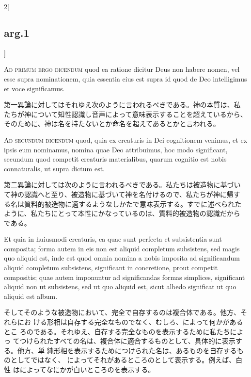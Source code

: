 \documentclass[paper=a4paper,fontsize=10pt,jafontsize=9pt,titlepage]{jlreq}
\begin{document}
\begin{paracol}{2}[\subsection{arg.1}]
\switchcolumn*[\subsection{ad.1}]

{\scshape Ad primum ergo dicendum} quod ea ratione dicitur Deus non habere
nomen, vel esse supra nominationem, quia essentia eius est supra id
quod de Deo intelligimus et voce significamus.

\switchcolumn

第一異論に対してはそれゆえ次のように言われるべきである。神の本質は、私
たちが神について知性認識し音声によって意味表示することを超えているから、
そのために、神は名を持たないとか命名を超えてあるとかと言われる。

\switchcolumn*[\subsection{ad.2}]

{\scshape Ad secundum dicendum} quod, quia ex creaturis in Dei cognitionem
venimus, et ex ipsis eum nominamus, nomina quae Deo attribuimus, hoc
modo significant, secundum quod competit creaturis materialibus, quarum
cognitio est nobis connaturalis, ut supra dictum est.

\switchcolumn

第二異論に対しては次のように言われるべきである。私たちは被造物に基づい
て神の認識へと至り、被造物に基づいて神を名付けるので、私たちが神に帰す
る名は質料的被造物に適するようなしかたで意味表示する。すでに述べられた
ように、私たちにとって本性にかなっているのは、質料的被造物の認識だから
である。

\switchcolumn*

Et quia in huiusmodi creaturis, ea quae sunt perfecta et subsistentia
sunt composita; forma autem in eis non est aliquid completum
subsistens, sed magis quo aliquid est, inde est quod omnia nomina a
nobis imposita ad significandum aliquid completum subsistens,
significant in concretione, prout competit compositis; quae autem
imponuntur ad significandas formas simplices, significant aliquid non
ut subsistens, sed ut quo aliquid est, sicut albedo significat ut quo
aliquid est album.

\switchcolumn

そしてそのような被造物において、完全で自存するのは複合体である。他方、それらにお
ける形相は自存する完全なものでなく、むしろ、によって何かがあるとこ
ろのである。それゆえ、自存する完全なものを表示するために私たちによっ
てつけられたすべての名は、複合体に適合するものとして、具体的に表示する。他方、単
純形相を表示するためにつけられた名は、あるものを自存するものとしてではなく、
によってそれがあるところのとして表示する。例えば、白性
はによってなにかが白いところのを表示する。


\end{paracol}
\end{document}
